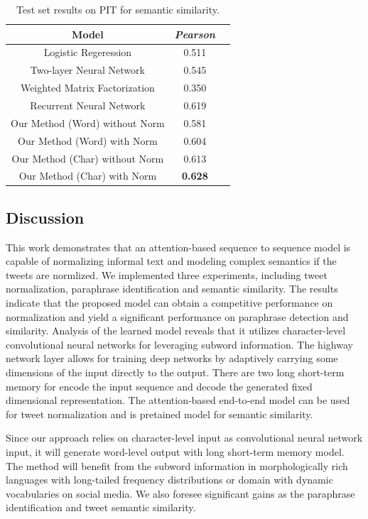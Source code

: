 \documentclass[letterpaper]{article}
\begin{document}
\begin{table}
	\begin{center}
		\begin{tabular}{| c | c | c | }
			\hline
			\bf Model & \bf \textit{Pearson}  \\ \hline
			Logistic Regeression  & 0.511   \\ \hline
			Two-layer Neural Network  & 0.545   \\ 
			\hline
			Weighted Matrix Factorization  & 0.350   \\ 
			\hline
			Recurrent Neural Network  & 0.619   \\ 
			\hline
			Our Method (Word) without Norm  & 0.581   \\ 
			\hline
			Our Method (Word) with Norm  & 0.604   \\ 
			\hline
			Our Method (Char) without Norm & 0.613   \\ 
			\hline
			Our Method (Char) with Norm  & \bf 0.628  \\ 
			\hline
		\end{tabular}
		\caption{Test set results on PIT for semantic similarity.}
	\end{center}
\end{table}

\subsection{Discussion}
This work demonstrates that an attention-based sequence to sequence model is capable of normalizing informal text and modeling complex semantics if the tweets are normlized. We implemented three experiments, including tweet normalization, paraphrase identification and semantic similarity. The results indicate that the proposed model can obtain a competitive performance on normalization and yield a significant performance on paraphrase detection and similarity. Analysis of the learned model reveals that it utilizes character-level convolutional neural networks for leveraging subword information. The highway network layer allows for training deep networks by adaptively carrying some dimensions of the input directly to the output. There are two long short-term memory for encode the input sequence and decode the generated fixed dimensional representation. The attention-based end-to-end model can be used for tweet normalization and is pretained model for semantic similarity.

Since our approach relies on character-level input as convolutional neural network input, it will generate word-level output with long short-term memory model. The method  will benefit from the subword information in morphologically rich languages with long-tailed frequency distributions or domain with dynamic vocabularies on social media. We also foresee significant gains as the paraphrase identification and tweet semantic similarity. 
\end{document}
